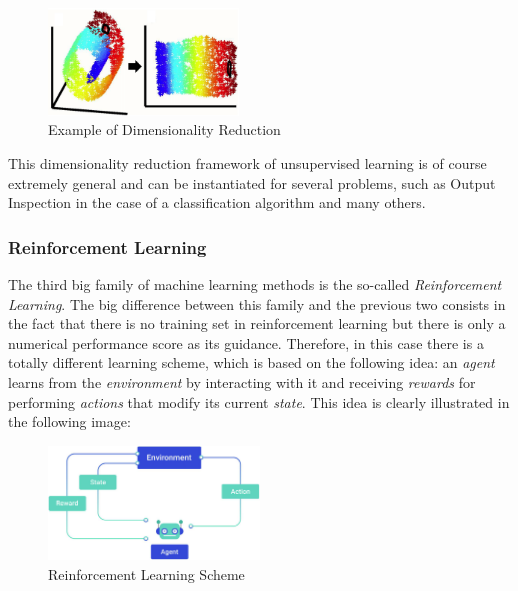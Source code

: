 \begin{itemize}
            \vspace{5mm}

            \begin{figure}[h]
                  \centering
                  \includegraphics[width=0.45\textwidth]{../img/Dim_reduction_example}
                  \caption{Example of Dimensionality Reduction}
            \end{figure}

            \vspace{5mm}

            This dimensionality reduction framework of unsupervised
            learning is of course extremely general and can be
            instantiated for several problems, such as Output Inspection
            in the case of a classification algorithm and many others.
\end{itemize}

\subsubsection{Reinforcement Learning}

The third big family of machine learning methods is the so-called
\emph{Reinforcement Learning}. The big difference between this
family and the previous two consists in the fact that there is no
training set in reinforcement learning but there is only a numerical
performance score as its guidance. Therefore, in this case there is a
totally different learning scheme, which is based on the following idea:
an \emph{agent} learns from the \emph{environment} by interacting with
it and receiving \emph{rewards} for performing \emph{actions} that
modify its current \emph{state}. This idea is clearly illustrated in the
following image:

\vspace{2mm}

\begin{figure}[h]
      \centering
      \includegraphics[width=0.5\textwidth]{../img/Reinforcement_learning}
      \caption{Reinforcement Learning Scheme}
\end{figure}

